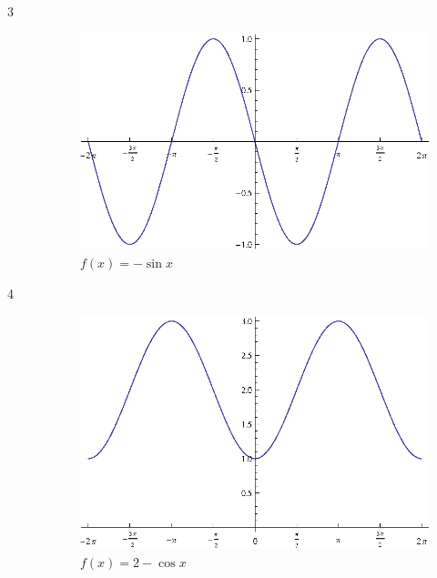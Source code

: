 \documentclass{exam}
\begin{document}
\begin{description}
      \item[3]
        \begin{figure}[H]
          \centering
          \includegraphics[scale=0.8]{exercise03.eps}
          \caption{$f(x) = -\sin x$}
        \end{figure}

      \item[4]
        \begin{figure}[H]
          \centering
          \includegraphics[scale=0.8]{exercise04.eps}
          \caption{$f(x) = 2 - \cos x$}
        \end{figure}


\end{description}
\end{document}
